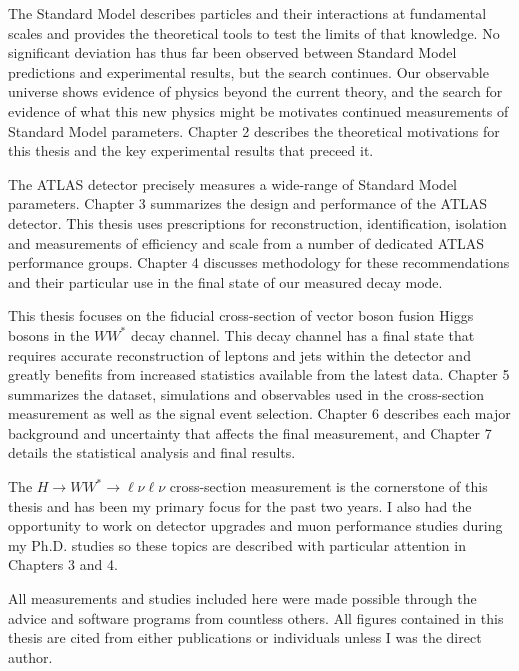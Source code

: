 The Standard Model describes particles and their interactions at fundamental scales and provides the theoretical tools to test the limits of that knowledge. No significant deviation has thus far been observed between Standard Model predictions and experimental results, but the search continues. Our observable universe shows evidence of physics beyond the current theory, and the search for evidence of what this new physics might be motivates continued measurements of Standard Model parameters. Chapter 2 describes the theoretical motivations for this thesis and the key experimental results that preceed it. 
 
The ATLAS detector precisely measures a wide-range of Standard Model parameters. Chapter 3 summarizes the design and performance of the ATLAS detector. This thesis uses prescriptions for reconstruction, identification, isolation and measurements of efficiency and scale from a number of dedicated ATLAS performance groups. Chapter 4 discusses methodology for these recommendations and their particular use in the final state of our measured decay mode. 

 This thesis focuses on the fiducial cross-section of vector boson fusion Higgs bosons in the $WW^*$ decay channel. This decay channel has a final state that requires accurate reconstruction of leptons and jets within the detector and greatly benefits from increased statistics available from the latest data. Chapter 5 summarizes the dataset, simulations and observables used in the cross-section measurement as well as the signal event selection. Chapter 6 describes each major background and uncertainty that affects the final measurement, and Chapter 7 details the statistical analysis and final results.  

The $H\rightarrow WW^*\rightarrow \ell\nu\ell\nu$ cross-section measurement is the cornerstone of this thesis and has been my primary focus for the past two years. I also had the opportunity to work on detector upgrades and muon performance studies during my Ph.D. studies so these topics are described with particular attention in Chapters 3 and 4. 

All measurements and studies included here were made possible through the advice and software programs from countless others. All figures contained in this thesis are cited from either publications or individuals unless I was the direct author.

